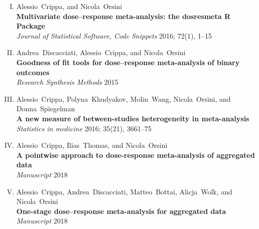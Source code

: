 \documentclass[11pt,a4paper,twoside,openany]{book}\usepackage{knitr}
\begin{document}
{\begin{enumerate}[I.]
\item Alessio~Crippa, and Nicola~Orsini \\ \textbf{Multivariate dose--response meta-analysis: the dosresmeta R Package} \\ \textit{Journal of Statistical Software, Code Snippets} 2016; 72(1), 1--15
\item Andrea~Discacciati, Alessio~Crippa, and Nicola~Orsini \\ \textbf{Goodness of fit tools for dose--response meta-analysis of binary outcomes} \\ \textit{Research Synthesis Methods} 2015
\item Alessio~Crippa, Polyna~Khudyakov, Molin~Wang, Nicola~Orsini, and Donna~Spiegelman \\ \textbf{A new measure of between-studies heterogeneity in meta-analysis} \\ \textit{Statistics in medicine} 2016; 35(21), 3661--75
\item Alessio~Crippa, Ilias~Thomas, and Nicola~Orsini \\ \textbf{A pointwise approach to dose-response meta-analysis of aggregated data} \\ \textit{Manuscript} 2018
\item Alessio~Crippa, Andrea~Discacciati, Matteo~Bottai, Alicja~Wolk, and Nicola~Orsini \\ \textbf{One-stage dose--response meta-analysis for aggregated data} \\ \textit{Manuscript} 2018
\end{enumerate}
 \\  

}
\end{document}
